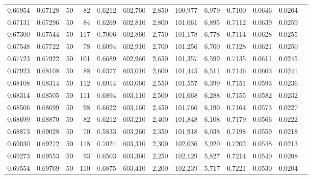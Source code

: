 \begin{tabular}{rrrrrrrrrrrrr}
0.66954 & 0.67128 &    50 &  82 &                                     0.6212 & 602,760 &   2,850 & 100,977 &   6,979 & 0.7100 & 0.0646 & 0.0264 \\
0.67131 & 0.67296 &    50 &  84 &                                     0.6269 & 602,810 &   2,800 & 101,061 &   6,895 & 0.7112 & 0.0639 & 0.0259 \\
0.67300 & 0.67544 &    50 & 117 &                                     0.7006 & 602,860 &   2,750 & 101,178 &   6,778 & 0.7114 & 0.0628 & 0.0255 \\
0.67548 & 0.67722 &    50 &  78 &                                     0.6094 & 602,910 &   2,700 & 101,256 &   6,700 & 0.7128 & 0.0621 & 0.0250 \\
0.67723 & 0.67922 &    50 & 101 &                                     0.6689 & 602,960 &   2,650 & 101,357 &   6,599 & 0.7135 & 0.0611 & 0.0245 \\
0.67923 & 0.68108 &    50 &  88 &                                     0.6377 & 603,010 &   2,600 & 101,445 &   6,511 & 0.7146 & 0.0603 & 0.0241 \\
0.68108 & 0.68314 &    50 & 112 &                                     0.6914 & 603,060 &   2,550 & 101,557 &   6,399 & 0.7151 & 0.0593 & 0.0236 \\
0.68314 & 0.68505 &    50 & 111 &                                     0.6894 & 603,110 &   2,500 & 101,668 &   6,288 & 0.7155 & 0.0582 & 0.0232 \\
0.68506 & 0.68699 &    50 &  98 &                                     0.6622 & 603,160 &   2,450 & 101,766 &   6,190 & 0.7164 & 0.0573 & 0.0227 \\
0.68699 & 0.68870 &    50 &  82 &                                     0.6212 & 603,210 &   2,400 & 101,848 &   6,108 & 0.7179 & 0.0566 & 0.0222 \\
0.68873 & 0.69028 &    50 &  70 &                                     0.5833 & 603,260 &   2,350 & 101,918 &   6,038 & 0.7198 & 0.0559 & 0.0218 \\
0.69030 & 0.69272 &    50 & 118 &                                     0.7024 & 603,310 &   2,300 & 102,036 &   5,920 & 0.7202 & 0.0548 & 0.0213 \\
0.69273 & 0.69553 &    50 &  93 &                                     0.6503 & 603,360 &   2,250 & 102,129 &   5,827 & 0.7214 & 0.0540 & 0.0208 \\
0.69554 & 0.69769 &    50 & 110 &                                     0.6875 & 603,410 &   2,200 & 102,239 &   5,717 & 0.7221 & 0.0530 & 0.0204 \\

\end{tabular}
